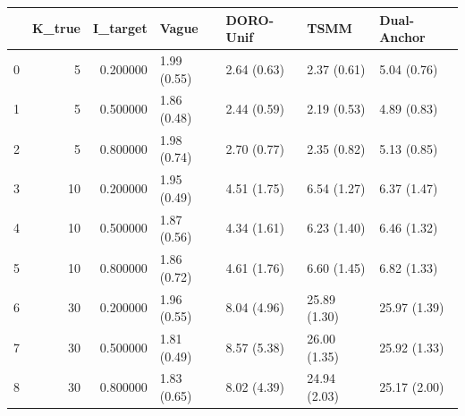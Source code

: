 \begin{tabular}{lrrllll}
\toprule
 & K_true & I_target & Vague & DORO-Unif & TSMM & Dual-Anchor \\
\midrule
0 & 5 & 0.200000 & 1.99 (0.55) & 2.64 (0.63) & 2.37 (0.61) & 5.04 (0.76) \\
1 & 5 & 0.500000 & 1.86 (0.48) & 2.44 (0.59) & 2.19 (0.53) & 4.89 (0.83) \\
2 & 5 & 0.800000 & 1.98 (0.74) & 2.70 (0.77) & 2.35 (0.82) & 5.13 (0.85) \\
3 & 10 & 0.200000 & 1.95 (0.49) & 4.51 (1.75) & 6.54 (1.27) & 6.37 (1.47) \\
4 & 10 & 0.500000 & 1.87 (0.56) & 4.34 (1.61) & 6.23 (1.40) & 6.46 (1.32) \\
5 & 10 & 0.800000 & 1.86 (0.72) & 4.61 (1.76) & 6.60 (1.45) & 6.82 (1.33) \\
6 & 30 & 0.200000 & 1.96 (0.55) & 8.04 (4.96) & 25.89 (1.30) & 25.97 (1.39) \\
7 & 30 & 0.500000 & 1.81 (0.49) & 8.57 (5.38) & 26.00 (1.35) & 25.92 (1.33) \\
8 & 30 & 0.800000 & 1.83 (0.65) & 8.02 (4.39) & 24.94 (2.03) & 25.17 (2.00) \\
\bottomrule
\end{tabular}

